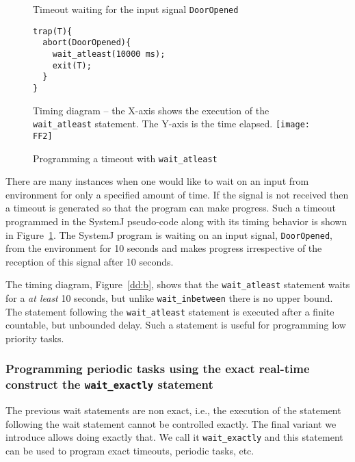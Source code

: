 \begin{figure}[b!]
	\centering
	\vspace{-10pt}
        \begin{SubFloat}{\label{dd:a}Timeout waiting for the input
            signal \texttt{DoorOpened}}
        \begin{lstlisting}[style=sysj,morekeywords={abort,await,emit,present,trap,pause,exit,wait_atleast,suspend}]
trap(T){
  abort(DoorOpened){
    wait_atleast(10000 ms);
    exit(T);  
  }
}
\end{lstlisting}
\end{SubFloat}
\begin{SubFloat}{\label{dd:b}Timing diagram -- the X-axis shows the
    execution of the \texttt{wait\_atleast} statement. The Y-axis is the
    time elapsed.}
\texttt{[image: FF2]}
\end{SubFloat}
\caption{Programming a timeout with \texttt{wait\_atleast}}
\label{dd}
\end{figure}

There are many instances when one would like to wait on an input from
environment for only a specified amount of time. If the signal is not
received then a timeout is generated so that the program can make
progress. Such a timeout programmed in the SystemJ pseudo-code along
with its timing behavior is shown in Figure~\ref{dd}. The SystemJ
program is waiting on an input signal, \texttt{DoorOpened}, from the
environment for 10 seconds and makes progress irrespective of the
reception of this signal after 10 seconds.

The timing diagram, Figure~\ref{dd:b}, shows that the
\texttt{wait\_atleast} statement waits for a \textit{at least} 10
seconds, but unlike \texttt{wait\_inbetween} there is no upper
bound. The statement following the \texttt{wait\_atleast} statement is
executed after a finite countable, but unbounded delay. Such a statement
is useful for programming low priority tasks.


\subsubsection{Programming periodic tasks using the exact real-time
  construct the \texttt{wait\_exactly} statement}
\label{sec:progr-using-exact}

The previous wait statements are non exact, i.e., the execution of the
statement following the wait statement cannot be controlled exactly. The
final variant we introduce allows doing exactly that. We call it
\texttt{wait\_exactly} and this statement can be used to program exact
timeouts, periodic tasks, etc.

